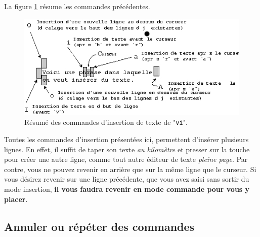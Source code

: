 La figure \ref{ann-edt-vi-insert-fig} r{\'e}sume les commandes
pr{\'e}c{\'e}dentes.

\begin{figure}[hbtp]
\includegraphics{./_Images/ann-edt-vi/insert-cmds.jpg}
\caption{\label{ann-edt-vi-insert-fig}R{\'e}sum{\'e} des commandes d'insertion
	de texte de "{\tt vi}".}
\end{figure}

\begin{remarque}
Toutes les commandes d'insertion pr{\'e}sent{\'e}es ici, permettent
d'ins{\'e}rer plusieurs lignes. En effet, il suffit de taper son texte
{\it au kilom{\`e}tre} et presser sur la touche {\returnkey} pour
cr{\'e}er une autre ligne, comme tout autre {\'e}diteur de texte
{\it pleine page}. Par contre, vous ne pouvez revenir en arri{\`e}re que sur
la m{\^e}me ligne que le curseur. Si vous d{\'e}sirez revenir sur une
ligne pr{\'e}c{\'e}dente, que vous avez saisi sans sortir du mode
insertion, {\bf il vous faudra revenir en mode commande pour vous y
placer}.
\end{remarque}


\subsection{\label{ann-edt-vi-undo}Annuler ou r{\'e}p{\'e}ter des commandes}


